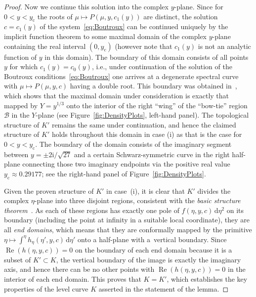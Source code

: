 \documentclass[11pt]{article}
\numberwithin{equation}{section}
\numberwithin{equation}{section}
\begin{document}
\begin{proof}
Now we continue this solution into the complex $y$-plane. Since for $0<y<y_\mathrm{c}$ the roots of $\mu\mapsto P(\mu,y,c_1(y))$ are distinct, the solution $c=c_1(y)$ of the system~\eqref{eq:Boutroux} can be continued uniquely by the implicit function theorem to some maximal domain of the complex $y$-plane containing the real interval $(0,y_\mathrm{c})$ (however note that $c_1(y)$ is not an analytic function of $y$ in this domain). The boundary of this domain consists of all points $y$ for which $c_1(y)=c_0(y)$, i.e., under continuation of the solution of the Boutroux conditions~\eqref{eq:Boutroux} one arrives at a degenerate spectral curve with $\mu\mapsto P(\mu,y,c)$ having a double root. This boundary was obtained in~\cite[Section 4.7]{BuckinghamM22}, which shows that the maximal domain under consideration is exactly that mapped by $Y=y^{1/3}$ onto the interior of the right ``wing'' of the ``bow-tie'' region $\mathcal{B}$ in the $Y$-plane (see Figure~\ref{fig:DensityPlots}, left-hand panel). The topological structure of $K'$ remains the same under continuation, and hence the claimed structure of $K'$ holds throughout this domain in case (i) as that is the case for $0<y<y_\mathrm{c}$. The boundary of the domain consists of the imaginary segment between $y=\pm 2\mathrm{i}/
\sqrt{27}$ and a certain Schwarz-symmetric curve in the right half-plane connecting those two imaginary endpoints via the positive real value $y_\mathrm{c}\approx 0.29177$; see the right-hand panel of Figure~\ref{fig:DensityPlots}.

Given the proven structure of $K'$ in case~(i), it is clear that $K'$ divides the complex $\eta$-plane into three disjoint regions, consistent with the \emph{basic structure theorem}~\cite[p.~37]{Jenkins58}. As each of these regions has exactly one pole of $f(\eta,y,c)\,\mathrm{d}\eta^2$ on its boundary (including the point at infinity in a suitable local coordinate), they are all \emph{end domains}, which means that they are conformally mapped by the primitive $\eta\mapsto \int^\eta h_\eta(\eta',y,c)\,\mathrm{d}\eta'$ onto a half-plane with a~vertical boundary. Since $\operatorname{Re}(h(\eta,y,c))=0$ on the boundary of each end domain because it is a subset of $K'\subset K$, the vertical boundary of the image is exactly the imaginary axis, and hence there can be no other points with $\operatorname{Re}(h(\eta,y,c))=0$ in the interior of each end domain. This proves that $K=K'$, which establishes the key properties of the level curve $K$ asserted in the statement of the lemma.


\end{proof}
\end{document}

